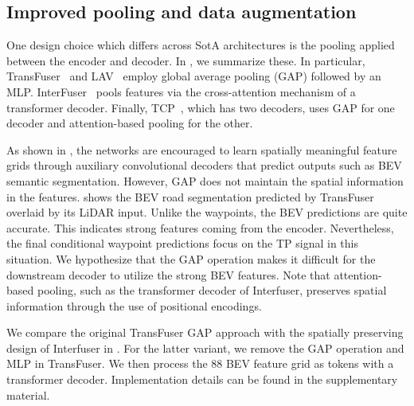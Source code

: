 \subsection{Improved pooling and data augmentation}
\label{sec:mitigating_tp}

One design choice which differs across SotA architectures is the pooling applied between the encoder and decoder. In , we summarize these. In particular, TransFuser~\cite{Chitta2022PAMI} and LAV~\cite{Chen2022CVPRa} employ global average pooling (GAP) followed by an MLP. InterFuser~\cite{Shao2022CORL} pools features via the cross-attention mechanism of a transformer decoder. Finally, TCP~\cite{Wu2022NeurIPS}, which has two decoders, uses GAP for one decoder and attention-based pooling for the other.

As shown in , the networks are encouraged to learn spatially meaningful feature grids through auxiliary convolutional decoders that predict outputs such as BEV semantic segmentation. However, GAP does not maintain the spatial information in the features.  shows the BEV road segmentation predicted by TransFuser overlaid by its LiDAR input. Unlike the waypoints, the BEV predictions are quite accurate. This indicates strong features coming from the encoder. Nevertheless, the final conditional waypoint predictions focus on the TP signal in this situation. We hypothesize that the GAP operation makes it difficult for the downstream decoder to utilize the strong BEV features. Note that attention-based pooling, such as the transformer decoder of Interfuser, preserves spatial information through the use of positional encodings.

We compare the original TransFuser GAP approach with the spatially preserving design of Interfuser in . For the latter variant, we remove the GAP operation and MLP in TransFuser. We then process the 88 BEV feature grid as tokens with a transformer decoder. Implementation details can be found in the supplementary material. 

